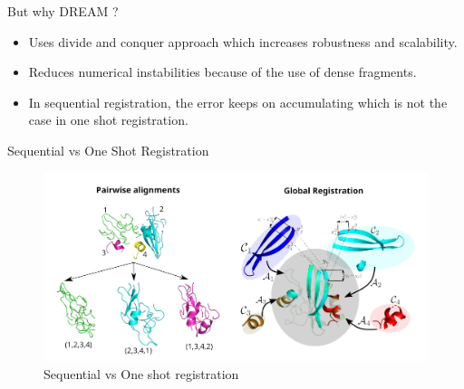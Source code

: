 \begin{frame}{But why DREAM ?}
    \begin{itemize}
        \item Uses divide and conquer approach which increases robustness and scalability.
        \pause
        \item Reduces numerical instabilities because of the use of dense fragments.
        \pause
        \item In sequential registration, the error keeps on accumulating which is not the case in one shot registration.
    \end{itemize}
\end{frame}

\begin{frame}{Sequential vs One Shot Registration}
    \begin{figure}[h]
        \centering
        \includegraphics[width=1\textwidth]{images/seq.png}
        \caption{Sequential vs One shot registration}
        \label{fig:my_label}
    \end{figure}
\end{frame}